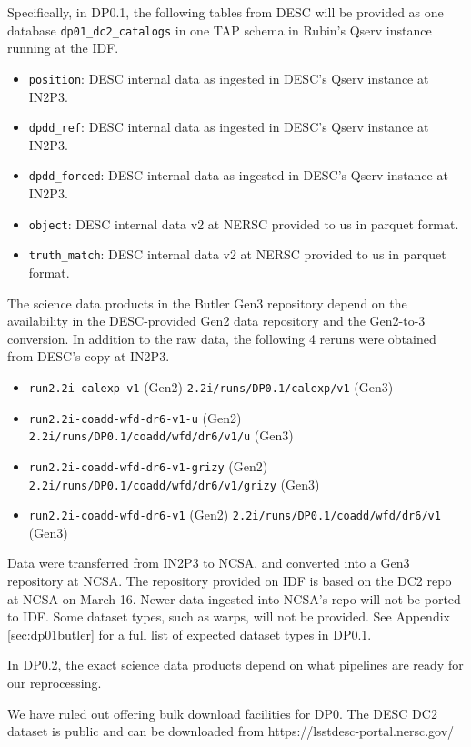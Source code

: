 Specifically, in DP0.1, the following tables from DESC will be provided as one database \texttt{dp01\_dc2\_catalogs} in one TAP schema in Rubin's Qserv instance running at the IDF.
\begin{itemize}
\item \texttt{position}: DESC internal data as ingested in DESC's Qserv instance at IN2P3.
\item \texttt{dpdd\_ref}: DESC internal data as ingested in DESC's Qserv instance at IN2P3.
\item \texttt{dpdd\_forced}: DESC internal data as ingested in DESC's Qserv instance at IN2P3.
\item \texttt{object}: DESC internal data v2 at NERSC provided to us in parquet format.
\item \texttt{truth\_match}: DESC internal data v2 at NERSC provided to us in parquet format.
\end{itemize}

The science data products in the Butler Gen3 repository depend on the availability in the DESC-provided Gen2 data repository and the Gen2-to-3 conversion.
In addition to the raw data, the following 4 reruns were obtained from DESC's copy at IN2P3.
\begin{itemize}
\item \texttt{run2.2i-calexp-v1} (Gen2) \texttt{2.2i/runs/DP0.1/calexp/v1} (Gen3)
\item \texttt{run2.2i-coadd-wfd-dr6-v1-u} (Gen2) \texttt{2.2i/runs/DP0.1/coadd/wfd/dr6/v1/u} (Gen3)
\item \texttt{run2.2i-coadd-wfd-dr6-v1-grizy} (Gen2) \texttt{2.2i/runs/DP0.1/coadd/wfd/dr6/v1/grizy} (Gen3)
\item \texttt{run2.2i-coadd-wfd-dr6-v1} (Gen2) \texttt{2.2i/runs/DP0.1/coadd/wfd/dr6/v1} (Gen3)
\end{itemize}

Data were transferred from IN2P3 to NCSA, and converted into a Gen3 repository at NCSA.
The repository provided on IDF is based on the DC2 repo at NCSA on March 16.
Newer data ingested into NCSA's repo will not be ported to IDF.
Some dataset types, such as warps, will not be provided.
See Appendix \ref{sec:dp01butler} for a full list of expected dataset types in DP0.1.


In DP0.2, the exact science data products depend on what pipelines are ready for our reprocessing.

We have ruled out offering bulk download facilities for DP0.
The DESC DC2 dataset is public and can be downloaded from https://lsstdesc-portal.nersc.gov/

